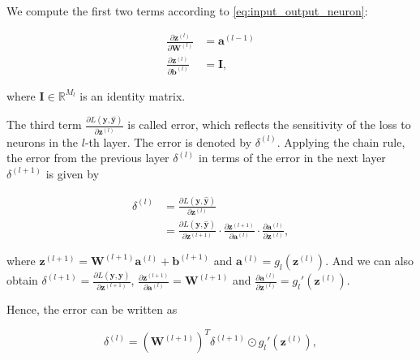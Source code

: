\documentclass[
	parskip, 			   %
	twoside, 			   %
	DIV=14, 			   %
	BCOR=15.0mm, 		   %
	headsepline, 		   %
	open=right, 		   %
	captions=tableheading, %
	bibliography=totoc,    %
	numbers=noenddot       %
]{scrreprt}
\begin{document}
We compute the first two terms according to \ref{eq:input_output_neuron}:

\begin{equation}
    \label{eq:two_terms}
    \begin{aligned}
        \frac{\partial \mathbf{z}^{(l)}}{\partial \mathbf{W}^{(l)}} &= \mathbf{a}^{(l-1)}
        \\
        \frac{\partial \mathbf{z}^{(l)}}{\partial \mathbf{b}^{(l)}} &= \mathbf{I},
    \end{aligned}
\end{equation}

where $\mathbf{I} \in \mathbb{R}^{M_{l}}$ is an identity matrix. 

The third term $\frac{\partial L \left( \mathbf{y}, \hat{\mathbf{y}} \right)}{\partial \mathbf{z}^{(l)}}$ is called error, which reflects the sensitivity of the loss to neurons in the $l$-th layer. The error is denoted by $\delta^{(l)}$. Applying the chain rule, the error from the previous layer $\delta^{(l)}$ in terms of the error in the next layer $\delta^{(l+1)}$ is given by

\begin{equation}
    \label{eq:error_in_one_layer}
    \begin{aligned}
        \delta^{(l)} &= \frac{\partial L \left( \mathbf{y}, \hat{\mathbf{y}} \right)}{\partial \mathbf{z}^{(l)}}
        \\
        &= \frac{\partial L \left( \mathbf{y}, \hat{\mathbf{y}} \right)}{\partial \mathbf{z}^{(l+1)}} \cdot \frac{\partial \mathbf{z}^{(l+1)}}{\partial \mathbf{a}^{(l)}} \cdot \frac{\partial \mathbf{a}^{(l)}}{\partial \mathbf{z}^{(l)}},
    \end{aligned}
\end{equation}

where $\mathbf{z}^{(l+1)} = \mathbf{W}^{(l+1)} \mathbf{a}^{(l)} + \mathbf{b}^{(l+1)}$ and $\mathbf{a}^{(l)} = g_{l}(\mathbf{z}^{(l)})$. And we can also obtain $\delta^{(l+1)}=\frac{\partial L \left( \mathbf{y}, \hat{\mathbf{y}} \right)}{\partial \mathbf{z}^{(l+1)}}$, $\frac{\partial \mathbf{z}^{(l+1)}}{\partial \mathbf{a}^{(l)}} = \mathbf{W}^{(l+1)}$ and $\frac{\partial \mathbf{a}^{(l)}}{\partial \mathbf{z}^{(l)}} = g_{l}'(\mathbf{z}^{(l)})$.

Hence, the error can be written as

\begin{equation}
    \label{eq:error_in_one_line}
        \delta^{(l)} = (\mathbf{W}^{(l+1)})^T \delta^{(l+1)} \odot g_{l}'(\mathbf{z}^{(l)}),
\end{equation}
\end{document}
